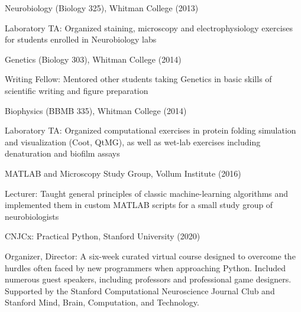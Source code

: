 \documentclass[10pt]{article}
\begin{document}
\begin{lonelist}
\item[] Neurobiology (Biology 325), Whitman College (2013)
	\begin{innerlist}
	\item Laboratory TA: Organized staining, microscopy and electrophysiology exercises for students enrolled in Neurobiology labs
	\end{innerlist}
\item[] Genetics (Biology 303), Whitman College (2014)
	\begin{innerlist}
	\item Writing Fellow: Mentored other students taking Genetics in basic skills of scientific writing and figure preparation
	\end{innerlist}
\item[] Biophysics (BBMB 335), Whitman College (2014)
	\begin{innerlist}
	\item Laboratory TA: Organized computational exercises in protein folding simulation and visualization (Coot, QtMG), as well as wet-lab exercises including denaturation and biofilm assays
	\end{innerlist}
\item[] MATLAB and Microscopy Study Group, Vollum Institute (2016)
	\begin{innerlist}
	\item Lecturer: Taught general principles of classic machine-learning algorithms and implemented them in custom MATLAB scripts for a small study group of neurobiologists
	\end{innerlist}
\item[] CNJCx: Practical Python, Stanford University (2020)
	\begin{innerlist}
	\item Organizer, Director: A six-week curated virtual course designed to overcome the hurdles often faced by new programmers when approaching Python. Included numerous guest speakers, including professors and professional game designers. Supported by the Stanford Computational Neuroscience Journal Club and Stanford Mind, Brain, Computation, and Technology.
	\end{innerlist}




\end{lonelist}
\end{document}
